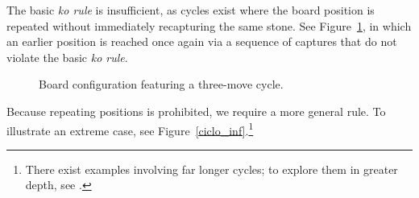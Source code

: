 The basic \textit{ko rule} is insufficient, as cycles exist where the board position is repeated without immediately recapturing the same stone. See Figure~\ref{ciclo_ko}, in which an earlier position is reached once again via a sequence of captures that do not violate the basic \textit{ko rule}.
\begin{figure}[H]
	\centering
	\begin{goban}[7, hoshi = false, name = borde0]
	\end{goban}
	\quad
	\begin{goban}[7, hoshi = false, resume = borde0,name=borde1]
	\end{goban}
	\quad
	\begin{goban}[7, hoshi = false, resume = borde1,name=borde2]
	\end{goban}
	\quad
	\begin{goban}[7, hoshi = false, resume = borde2]
	\end{goban}
	\caption{Board configuration featuring a three-move cycle.}
	\label{ciclo_ko}
\end{figure}
Because repeating positions is prohibited, we require a more general rule. To illustrate an extreme case, see Figure~\ref{ciclo_inf}.\footnote{There exist examples involving far longer cycles; to explore them in greater depth, see \cite{cicloinfinito}.}
